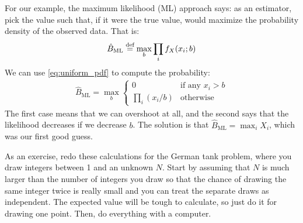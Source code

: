 For our example, the maximum likelihood (ML) approach says: as an estimator, pick
the value such that, if it were the true value, would maximize the probability
density of the observed data. That is:
\begin{equation}
\hat{B}_\text{ML} \stackrel{\text{def}}{=} \max_b \prod_i f_X(x_i; b)
\end{equation}
We can use \eqref{eq:uniform_pdf} to compute the probability:
\begin{align*}
\hat{B}_\text{ML} = \max_b \begin{cases}
0 &\text{if any $x_i > b$} \\
\prod_i (x_i/b) &\text{otherwise}
\end{cases}
\end{align*}
The first case means that we can overshoot at all, and the second says that
the likelihood decreases if we decrease $b$. The solution is that
$\hat{B}_\text{ML} = \max_i X_i$, which was our first good guess.

As an exercise, redo these calculations for the German tank problem, where you
draw integers between 1 and an unknown $N$. Start by assuming that $N$ is much
larger than the number of integers you draw so that the chance of drawing the
same integer twice is really small and you can treat the separate draws as
independent. The expected value will be tough to calculate, so just do it for
drawing one point. Then, do everything with a computer.

